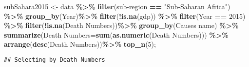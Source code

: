\documentclass[
]{article}
\newenvironment{Shaded}{\begin{snugshade}}{\end{snugshade}}
\newcommand{\AttributeTok}[1]{\textcolor[rgb]{0.13,0.29,0.53}{#1}}
\newcommand{\DecValTok}[1]{\textcolor[rgb]{0.00,0.00,0.81}{#1}}
\newcommand{\FunctionTok}[1]{\textcolor[rgb]{0.13,0.29,0.53}{\textbf{#1}}}
\newcommand{\NormalTok}[1]{#1}
\newcommand{\OtherTok}[1]{\textcolor[rgb]{0.56,0.35,0.01}{#1}}
\newcommand{\SpecialCharTok}[1]{\textcolor[rgb]{0.81,0.36,0.00}{\textbf{#1}}}
\newcommand{\StringTok}[1]{\textcolor[rgb]{0.31,0.60,0.02}{#1}}
\begin{document}
\begin{Shaded}
\begin{Highlighting}[]
\NormalTok{subSahara2015 }\OtherTok{\textless{}{-}}\NormalTok{ data }\SpecialCharTok{\%\textgreater{}\%}
\FunctionTok{filter}\NormalTok{(}\StringTok{\textasciigrave{}}\AttributeTok{sub{-}region}\StringTok{\textasciigrave{}} \SpecialCharTok{==} \StringTok{"Sub{-}Saharan Africa"}\NormalTok{)  }\SpecialCharTok{\%\textgreater{}\%}
\FunctionTok{group\_by}\NormalTok{(Year)}\SpecialCharTok{\%\textgreater{}\%}
\FunctionTok{filter}\NormalTok{(}\SpecialCharTok{!}\FunctionTok{is.na}\NormalTok{(gdp)) }\SpecialCharTok{\%\textgreater{}\%}
\FunctionTok{filter}\NormalTok{(Year }\SpecialCharTok{==} \DecValTok{2015}\NormalTok{) }\SpecialCharTok{\%\textgreater{}\%}
\FunctionTok{filter}\NormalTok{(}\SpecialCharTok{!}\FunctionTok{is.na}\NormalTok{(}\StringTok{\textasciigrave{}}\AttributeTok{Death Numbers}\StringTok{\textasciigrave{}}\NormalTok{))}\SpecialCharTok{\%\textgreater{}\%}
  \FunctionTok{group\_by}\NormalTok{(}\StringTok{\textasciigrave{}}\AttributeTok{Causes name}\StringTok{\textasciigrave{}}\NormalTok{) }\SpecialCharTok{\%\textgreater{}\%}
  \FunctionTok{summarize}\NormalTok{(}\StringTok{\textasciigrave{}}\AttributeTok{Death Numbers}\StringTok{\textasciigrave{}}\OtherTok{=}\FunctionTok{sum}\NormalTok{(}\FunctionTok{as.numeric}\NormalTok{(}\StringTok{\textasciigrave{}}\AttributeTok{Death Numbers}\StringTok{\textasciigrave{}}\NormalTok{))) }\SpecialCharTok{\%\textgreater{}\%}
  \FunctionTok{arrange}\NormalTok{(}\FunctionTok{desc}\NormalTok{(}\StringTok{\textasciigrave{}}\AttributeTok{Death Numbers}\StringTok{\textasciigrave{}}\NormalTok{))}\SpecialCharTok{\%\textgreater{}\%}
  \FunctionTok{top\_n}\NormalTok{(}\DecValTok{5}\NormalTok{);}
\end{Highlighting}
\end{Shaded}

\begin{verbatim}
## Selecting by Death Numbers
\end{verbatim}
\end{document}
